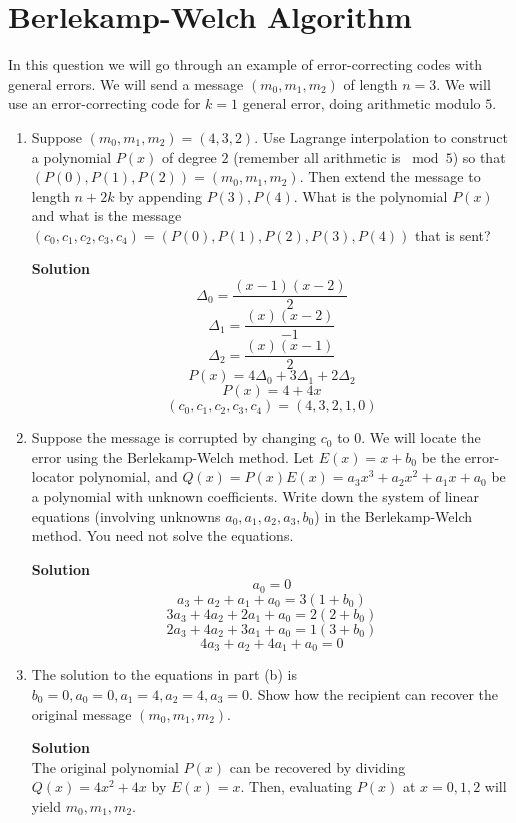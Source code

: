 \documentclass[11pt]{article}
\newcommand*{\Question}[1]{\section{#1}}
\newenvironment{Parts}{\begin{enumerate}[label=(\alph*)]}{\end{enumerate}}
\newcommand*{\Part}{\item}
\newenvironment{Answer}{\vspace{10pt}\begin{mdframed}\textbf{Solution}\\}{\end{mdframed}\vfill\pagebreak[3]}
\newenvironment{Answer}{\vspace{10pt}}{\vfill\pagebreak[3]}
\begin{document}
\Question{Berlekamp-Welch Algorithm}

In this question we will go through an example of error-correcting codes with
general errors.  We will send a message $(m_0,m_1,m_2)$ of length $n = 3$.
We will use an error-correcting code for $k = 1$ general error, doing
arithmetic modulo $5$.

\begin{Parts}
    \renewcommand{\labelenumi}{(\alph{enumi})}
    \Part Suppose $(m_0,m_1,m_2) = (4,3,2)$.  Use Lagrange interpolation to
    construct a polynomial $P(x)$ of degree $2$ (remember all arithmetic is $\bmod
    5$) so that $(P(0),P(1),P(2)) = (m_0,m_1,m_2)$.  Then extend the message to
    length $n+2k$ by appending $P(3),P(4)$.  What is the polynomial $P(x)$ and
    what is the message $(c_0,c_1,c_2,c_3,c_4) = (P(0),P(1),P(2),P(3),P(4))$ that
    is sent?
    \begin{Answer}
        $$\Delta_0=\frac{(x-1)(x-2)}{2}$$
        $$\Delta_1=\frac{(x)(x-2)}{-1}$$
        $$\Delta_2=\frac{(x)(x-1)}{2}$$
        $$P(x)=4 \Delta_0 + 3 \Delta_1 + 2 \Delta_2$$
        $$P(x)=4+4x$$
        $$(c_0,c_1,c_2,c_3,c_4)=(4,3,2,1,0)$$
    \end{Answer}

    \Part Suppose the message is corrupted by changing $c_0$ to $0$.  We will
    locate the error using the Berlekamp-Welch method.  Let $E(x) = x + b_0$ be
    the error-locator polynomial, and $Q(x) = P(x)E(x) = a_3x^3 + a_2x^2 + a_1x +
    a_0$ be a polynomial with unknown coefficients.  Write down the system of
    linear equations (involving unknowns $a_0,a_1,a_2,a_3,b_0$) in the
    Berlekamp-Welch method.  You need not solve the equations.
    \begin{Answer}
        $$a_0=0$$
        $$a_3+a_2+a_1+a_0=3(1+b_0)$$
        $$3a_3+4a_2+2a_1+a_0=2(2+b_0)$$
        $$2a_3+4a_2+3a_1+a_0=1(3+b_0)$$
        $$4a_3+a_2+4a_1+a_0=0$$
    \end{Answer}

    \Part The solution to the equations in part (b) is $b_0 = 0, a_0 = 0, a_1 = 4,
    a_2 = 4, a_3 = 0$.  Show how the recipient can recover the original message
    $(m_0,m_1,m_2)$.
    \begin{Answer}
        The original polynomial $P(x)$ can be recovered by dividing $Q(x)=4x^2+4x$ by $E(x)=x$. Then, evaluating $P(x)$ at $x=0,1,2$ will yield $m_0, m_1, m_2$.
    \end{Answer}
\end{Parts}
\end{document}
